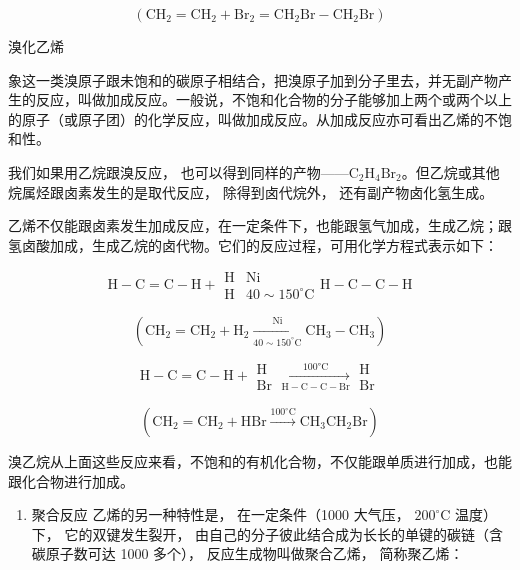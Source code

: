 \[
\left(\mathrm{CH} _ {2} = \mathrm{CH} _ {2} + \mathrm{Br} _ {2} = \mathrm{CH} _ {2} \mathrm{Br} - \mathrm{CH} _ {2} \mathrm{Br}\right)
\]

溴化乙烯

象这一类溴原子跟未饱和的碳原子相结合，把溴原子加到分子里去，并无副产物产生的反应，叫做加成反应。一般说，不饱和化合物的分子能够加上两个或两个以上的原子（或原子团）的化学反应，叫做加成反应。从加成反应亦可看出乙烯的不饱和性。

我们如果用乙烷跟溴反应，
也可以得到同样的产物------\(\mathrm{C}_{2} \mathrm{H}_{4} \mathrm{Br}_{2}\)。但乙烷或其他烷属烃跟卤素发生的是取代反应，
除得到卤代烷外， 还有副产物卤化氢生成。

乙烯不仅能跟卤素发生加成反应，在一定条件下，也能跟氢气加成，生成乙烷；跟氢卤酸加成，生成乙烷的卤代物。它们的反应过程，可用化学方程式表示如下：

\[
\mathrm{H} - \mathrm{C} = \mathrm{C} - \mathrm{H} + \begin{array}{ll} \mathrm{H} & \mathrm{Ni} \\ \mathrm{H} & 40 \sim 150 ^ {\circ} \mathrm{C} \end{array} \mathrm{H} - \mathrm{C} - \mathrm{C} - \mathrm{H}
\]

\[
(\mathrm{CH} _ {2} = \mathrm{CH} _ {2} + \mathrm{H} _ {2} \xrightarrow [ 40 \sim 150 ^ {\circ} \mathrm{C} ]{\mathrm{Ni}} \mathrm{CH} _ {3} - \mathrm{CH} _ {3})
\]

\[
\mathrm{H} - \mathrm{C} = \mathrm{C} - \mathrm{H} + \begin{array}{c} \mathrm{H} \\ \mathrm{Br} \end{array} \xrightarrow [ \mathrm{H} - \mathrm{C} - \mathrm{C} - \mathrm{Br} ]{\mathrm{100°C}} \begin{array}{c} \mathrm{H} \\ \mathrm{Br} \end{array}
\]

\[
\left(\mathrm{CH} _ {2} = \mathrm{CH} _ {2} + \mathrm{HBr} \xrightarrow {100 ^ {\circ} \mathrm{C}} \mathrm{CH} _ {3} \mathrm{CH} _ {2} \mathrm{Br}\right)
\]

溴乙烷从上面这些反应来看，不饱和的有机化合物，不仅能跟单质进行加成，也能跟化合物进行加成。

\begin{enumerate}[start=3]
\item
  聚合反应 乙烯的另一种特性是， 在一定条件（1000 大气压，
  \(200^{\circ} \mathrm{C}\) 温度）下， 它的双键发生裂开，
  由自己的分子彼此结合成为长长的单键的碳链（含碳原子数可达 1000 多个），
  反应生成物叫做聚合乙烯， 简称聚乙烯：
\end{enumerate}

